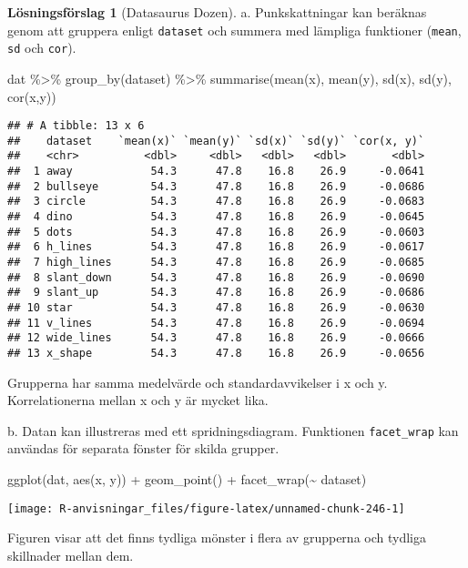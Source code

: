 \documentclass[
]{book}
\newenvironment{Shaded}{\begin{snugshade}}{\end{snugshade}}
\newcommand{\FunctionTok}[1]{\textcolor[rgb]{0.00,0.00,0.00}{#1}}
\newcommand{\NormalTok}[1]{#1}
\newcommand{\SpecialCharTok}[1]{\textcolor[rgb]{0.00,0.00,0.00}{#1}}
\theoremstyle{definition}
\theoremstyle{definition}
\theoremstyle{definition}
\theoremstyle{definition}
\newtheorem{hypothesis}{Lösningsförslag}[chapter]
\theoremstyle{remark}
\begin{document}
\begin{hypothesis}[Datasaurus Dozen]
a. Punkskattningar kan beräknas genom att gruppera enligt \texttt{dataset} och summera med lämpliga funktioner (\texttt{mean}, \texttt{sd} och \texttt{cor}).

\begin{Shaded}
\begin{Highlighting}[]
\NormalTok{dat }\SpecialCharTok{\%\textgreater{}\%}
  \FunctionTok{group\_by}\NormalTok{(dataset) }\SpecialCharTok{\%\textgreater{}\%} 
  \FunctionTok{summarise}\NormalTok{(}\FunctionTok{mean}\NormalTok{(x), }\FunctionTok{mean}\NormalTok{(y), }\FunctionTok{sd}\NormalTok{(x), }\FunctionTok{sd}\NormalTok{(y), }\FunctionTok{cor}\NormalTok{(x,y))}
\end{Highlighting}
\end{Shaded}

\begin{verbatim}
## # A tibble: 13 x 6
##    dataset    `mean(x)` `mean(y)` `sd(x)` `sd(y)` `cor(x, y)`
##    <chr>          <dbl>     <dbl>   <dbl>   <dbl>       <dbl>
##  1 away            54.3      47.8    16.8    26.9     -0.0641
##  2 bullseye        54.3      47.8    16.8    26.9     -0.0686
##  3 circle          54.3      47.8    16.8    26.9     -0.0683
##  4 dino            54.3      47.8    16.8    26.9     -0.0645
##  5 dots            54.3      47.8    16.8    26.9     -0.0603
##  6 h_lines         54.3      47.8    16.8    26.9     -0.0617
##  7 high_lines      54.3      47.8    16.8    26.9     -0.0685
##  8 slant_down      54.3      47.8    16.8    26.9     -0.0690
##  9 slant_up        54.3      47.8    16.8    26.9     -0.0686
## 10 star            54.3      47.8    16.8    26.9     -0.0630
## 11 v_lines         54.3      47.8    16.8    26.9     -0.0694
## 12 wide_lines      54.3      47.8    16.8    26.9     -0.0666
## 13 x_shape         54.3      47.8    16.8    26.9     -0.0656
\end{verbatim}

Grupperna har samma medelvärde och standardavvikelser i x och y. Korrelationerna mellan x och y är mycket lika.

b. Datan kan illustreras med ett spridningsdiagram. Funktionen \texttt{facet\_wrap} kan användas för separata fönster för skilda grupper.

\begin{Shaded}
\begin{Highlighting}[]
\FunctionTok{ggplot}\NormalTok{(dat, }\FunctionTok{aes}\NormalTok{(x, y)) }\SpecialCharTok{+}
  \FunctionTok{geom\_point}\NormalTok{() }\SpecialCharTok{+}
  \FunctionTok{facet\_wrap}\NormalTok{(}\SpecialCharTok{\textasciitilde{}}\NormalTok{ dataset)}
\end{Highlighting}
\end{Shaded}

\begin{center}\texttt{[image: R-anvisningar\_files/figure-latex/unnamed-chunk-246-1]} \end{center}

Figuren visar att det finns tydliga mönster i flera av grupperna och tydliga skillnader mellan dem.
\end{hypothesis}
\end{document}
